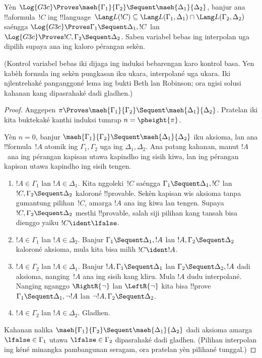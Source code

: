 \documentclass[../../../include/open-logic-section]{subfiles}
\begin{document}
\begin{lem}
Yèn $\Log{G3c}
\Proves \maeh{\Gamma_1}{\Gamma_2} \Sequent \maeh{\Delta_1}{\Delta_2}$,
banjur ana !!a{formula}~$!C$ ing !!{language}~$\Lang L(!C)
\subseteq \Lang L(\Gamma_1,
\Delta_1) \cap \Lang L(\Gamma_2, \Delta_2)$ saéngga
$\Log{G3c} \Proves \Gamma_1 \Sequent \Delta_1, !C$ lan
$\Log{G3c} \Proves !C, \Gamma_2 \Sequent \Delta_2$.
Saben variabel bebas ing interpolan uga dipilih supaya ana ing
kaloro pérangan sekèn.
\end{lem}
(Kontrol variabel bebas iki dijaga ing induksi bebarengan karo kontrol basa. Yen kabèh formula ing sekèn pungkasan iku ukara, interpolané uga ukara. Iki njlentrehaké panganggoné lema ing bukti Beth lan Robinson; ora ngisi solusi kahanan kang dipasrahaké dadi gladhen.)

\begin{proof}
  Anggepen $\pi \Proves \maeh{\Gamma_1}{\Gamma_2} \Sequent
  \maeh{\Delta_1}{\Delta_2}$. Pratelan iki kita buktekaké
  kanthi induksi tumrap $n=\pheight{\pi}$.

  Yèn $n=0$, banjur $\maeh{\Gamma_1}{\Gamma_2} \Sequent
  \maeh{\Delta_1}{\Delta_2}$ iku aksioma, lan ana
  !!{formula}~$!A$ atomik ing $\Gamma_1, \Gamma_2$
  uga ing $\Delta_1, \Delta_2$. Ana patang kahanan,
  manut $!A$~ana ing pérangan kapisan utawa kapindho
  ing sisih kiwa, lan ing pérangan kapisan utawa kapindho
  ing sisih tengen.
  \begin{enumerate}
    \item $!A \in \Gamma_1$ lan $!A \in \Delta_1$.
    Kita nggoleki~$!C$ saéngga
    $\Gamma_1 \Sequent \Delta_1, !C$ lan
    $!C, \Gamma_2 \Sequent \Delta_2$ kaloroné !!{provable}.
    Sekèn kapisan wis aksioma tanpa gumantung pilihan~$!C$,
    amarga $!A$ ana ing kiwa lan tengen. Supaya
    $!C, \Gamma_2 \Sequent \Delta_2$ mesthi !!{provable},
    salah siji pilihan kang tansah bisa dienggo yaiku $!C \ident \lfalse$.
    \item $!A \in \Gamma_1$ lan $!A \in \Delta_2$.
    Banjur $\Gamma_1 \Sequent \Delta_1, !A$ lan
    $!A, \Gamma_2 \Sequent \Delta_2$ kaloroné aksioma,
    mula kita bisa milih $!C \ident !A$.
    \item $!A \in \Gamma_2$ lan $!A \in \Delta_1$.
    Banjur $!A, \Gamma_1 \Sequent \Delta_1$ lan
    $\Gamma_2 \Sequent \Delta_2, !A$ dadi aksioma,
    nanging~$!A$ ana ing sisih kang kliru. Mula $!A$
    dudu interpolané. Nanging nganggo $\RightR{\lnot}$
    lan $\LeftR{\lnot}$ kita bisa !!{prove}
    $\Gamma_1 \Sequent \Delta_1, \lnot!A$ lan
    $\lnot !A, \Gamma_2 \Sequent \Delta_2$.
    \item $!A \in \Gamma_2$ lan $!A \in \Delta_2$.
    Gladhen.
  \end{enumerate}
  Kahanan nalika $\maeh{\Gamma_1}{\Gamma_2} \Sequent
  \maeh{\Delta_1}{\Delta_2}$ dadi aksioma amarga
  $\lfalse \in \Gamma_1$ utawa $\lfalse \in \Gamma_2$
dipasrahaké dadi gladhen.
(Pilihan interpolan ing kéné minangka pambangunan seragam, ora pratelan yèn pilihané tunggal.)


\end{proof}
\end{document}
